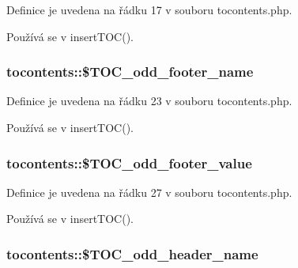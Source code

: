 Definice je uvedena na řádku 17 v souboru tocontents.\-php.



Používá se v insert\-T\-O\-C().

\hypertarget{classtocontents_a614b731f054903c0aaed7f630d9ed022}{
\subsubsection[{\$\-T\-O\-C\-\_\-odd\-\_\-footer\-\_\-name}]{\setlength{\rightskip}{0pt plus 5cm}tocontents\-::\$\-T\-O\-C\-\_\-odd\-\_\-footer\-\_\-name}}\label{classtocontents_a614b731f054903c0aaed7f630d9ed022}


Definice je uvedena na řádku 23 v souboru tocontents.\-php.



Používá se v insert\-T\-O\-C().

\hypertarget{classtocontents_af2ddca963e2f4ab43254d0080c30e4fb}{
\subsubsection[{\$\-T\-O\-C\-\_\-odd\-\_\-footer\-\_\-value}]{\setlength{\rightskip}{0pt plus 5cm}tocontents\-::\$\-T\-O\-C\-\_\-odd\-\_\-footer\-\_\-value}}\label{classtocontents_af2ddca963e2f4ab43254d0080c30e4fb}


Definice je uvedena na řádku 27 v souboru tocontents.\-php.



Používá se v insert\-T\-O\-C().

\hypertarget{classtocontents_a655d9e3d8a01e4208758d164c5ac6435}{
\subsubsection[{\$\-T\-O\-C\-\_\-odd\-\_\-header\-\_\-name}]{\setlength{\rightskip}{0pt plus 5cm}tocontents\-::\$\-T\-O\-C\-\_\-odd\-\_\-header\-\_\-name}}\label{classtocontents_a655d9e3d8a01e4208758d164c5ac6435}


